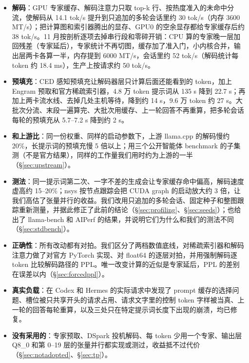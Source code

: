 \documentclass[11pt,a4paper]{article}
\newcommand{\tps}{tok/s}
\begin{document}
\begin{itemize}
  \item \textbf{解码}：GPU 专家缓存、解码注意力只取 top-k 行、按热度准入的未命中分流，使解码从 14.1 \tps{} 提升到只追加的多轮会话里约 30 \tps{}（内存 3600 MT/s）；把计算图和索引器腾出的显存、GPU0 的空余显存都给专家缓存后约 38 \tps{}。11 月按剖析逐项去掉串行段和零碎开销：CPU 算的专家晚一层加回残差（专家延后），专家统计不再切图，缓存加了准入门，小内核合并，输出层两卡各算一半，内存提到 6000 MT/s，会话里约 52 \tps{}（解码统计每 token 约 18.4 ms），生产上按请求约 50 \tps{}。
  \item \textbf{预填充}：CED 感知预填充让解码器层只计算后面还能看到的 token，加上 Engram 预取和官方稀疏索引器，4.8 万 token 提示词从 135 s 降到 22.7 s；再加上两卡流水线、去掉几处主机等待，降到约 14 s，9.6 万 token 约 27 s。大批次分流、末段一遍算完、大批次用缓存、上一轮回答不再重算，把多轮会话每轮的预填充从 5.7--7.2 s 降到约 2 s。
  \item \textbf{和上游比}：同一份权重、同样的启动参数下，上游 llama.cpp 的解码慢约 20\%，长提示词的预填充慢 5 倍以上；用三个公开智能体 benchmark 的子集测（不是官方结果），同样的工作量我们用时约为上游的一半（\S\ref{sec:upstream}）。
  \item \textbf{测法}：同一提示词第二次、一字不差的生成会让专家缓存命中偏高，解码速度虚高约 15--20\%；nsys 按节点跟踪会把 CUDA graph 的启动放大约 3 倍，让我们高估了张量并行的收益。我们改用只追加的多轮会话、固定种子和整图跟踪重新测量，并据此修正了此前的结论（\S\ref{sec:profiling}、\S\ref{sec:seeds}）；也给出了 llama-bench 和 AIPerf 的结果，并说明它们为什么和我们的测法不同（\S\ref{sec:stdbench}）。
  \item \textbf{正确性}：所有改动都有对拍。我们区分了两档数值底线，对稀疏索引器和解码注意力做了对官方 PyTorch 实现、对 float64 的逐层对拍，并用强制解码逐 token 比较解码路径的 PPL。唯一改变计算的近似是专家延后，PPL 的差别在误差以内（\S\ref{sec:forcedppl}）。
  \item \textbf{真实负载}：在 Codex 和 Hermes 的实际请求中发现了 prompt 缓存的选择问题、槽位被只共享开头的请求占用、请求文字里的控制 token 字样被当真、上一轮的回答每轮重算，以及三处只在特定提示词长度下出现的崩溃，均已修复。
  \item \textbf{没有采用的}：专家预取、DSpark 投机解码、每 token 少用一个专家、输出层 Q8\_0 和第 0--19 层的张量并行都实现或测过，收益抵不过代价（\S\ref{sec:notadopted}、\S\ref{sec:tp}）。
\end{itemize}
\end{document}

